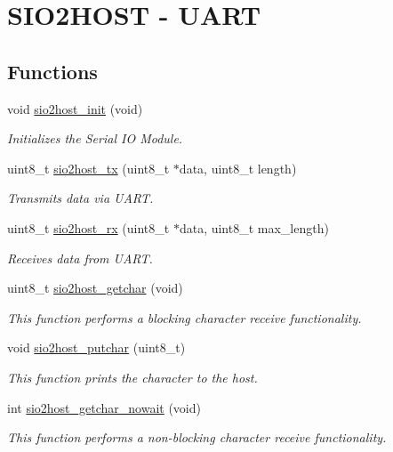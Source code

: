 \hypertarget{group__group__sio2host__uart}{}\section{S\+I\+O2\+H\+O\+ST -\/ U\+A\+RT}
\label{group__group__sio2host__uart}
\subsection*{Functions}
\begin{DoxyCompactItemize}
\item 
void \mbox{\hyperlink{group__group__sio2host__uart_ga6d7d78548e59b7991d13d5a1fa3c5440}{sio2host\+\_\+init}} (void)
\begin{DoxyCompactList}\small\item\em Initializes the Serial IO Module. \end{DoxyCompactList}\item 
uint8\+\_\+t \mbox{\hyperlink{group__group__sio2host__uart_gaf6c11e140f6115317c42db35a9262e0f}{sio2host\+\_\+tx}} (uint8\+\_\+t $\ast$data, uint8\+\_\+t length)
\begin{DoxyCompactList}\small\item\em Transmits data via U\+A\+RT. \end{DoxyCompactList}\item 
uint8\+\_\+t \mbox{\hyperlink{group__group__sio2host__uart_ga627cf2cfc75197c5c927315bdf1b6449}{sio2host\+\_\+rx}} (uint8\+\_\+t $\ast$data, uint8\+\_\+t max\+\_\+length)
\begin{DoxyCompactList}\small\item\em Receives data from U\+A\+RT. \end{DoxyCompactList}\item 
uint8\+\_\+t \mbox{\hyperlink{group__group__sio2host__uart_gabbb6def1150d2663a675bd384ae816d0}{sio2host\+\_\+getchar}} (void)
\begin{DoxyCompactList}\small\item\em This function performs a blocking character receive functionality. \end{DoxyCompactList}\item 
void \mbox{\hyperlink{group__group__sio2host__uart_gabb543e29f8fd3f02734f54838811f91e}{sio2host\+\_\+putchar}} (uint8\+\_\+t)
\begin{DoxyCompactList}\small\item\em This function prints the character to the host. \end{DoxyCompactList}\item 
int \mbox{\hyperlink{group__group__sio2host__uart_ga14c4b363b78d5be00daa0bdd56e6a4a9}{sio2host\+\_\+getchar\+\_\+nowait}} (void)
\begin{DoxyCompactList}\small\item\em This function performs a non-\/blocking character receive functionality. \end{DoxyCompactList}\end{DoxyCompactItemize}


